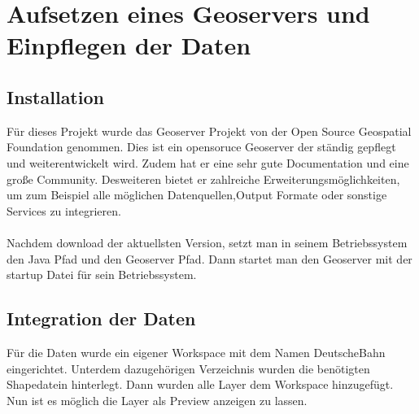 \section{Aufsetzen eines Geoservers und Einpflegen der Daten}

\subsection{Installation}
Für dieses Projekt wurde das Geoserver Projekt von der Open Source Geospatial Foundation genommen. \cite{geoserver} Dies ist ein opensoruce Geoserver der ständig gepflegt und weiterentwickelt wird. Zudem hat er eine sehr gute Documentation und eine große Community.
Desweiteren bietet er zahlreiche Erweiterungsmöglichkeiten, um zum Beispiel alle möglichen Datenquellen,Output Formate oder sonstige Services zu integrieren.
\\\\
Nachdem download der aktuellsten Version, setzt man in seinem Betriebssystem den Java Pfad und den Geoserver Pfad. Dann startet man den Geoserver mit der startup Datei für sein Betriebssystem.
\subsection{Integration der Daten}
Für die Daten wurde ein eigener Workspace mit dem Namen DeutscheBahn eingerichtet. Unterdem dazugehörigen Verzeichnis wurden die benötigten Shapedatein hinterlegt.
Dann wurden alle Layer dem Workspace hinzugefügt. Nun ist es möglich die Layer als Preview anzeigen zu lassen.
